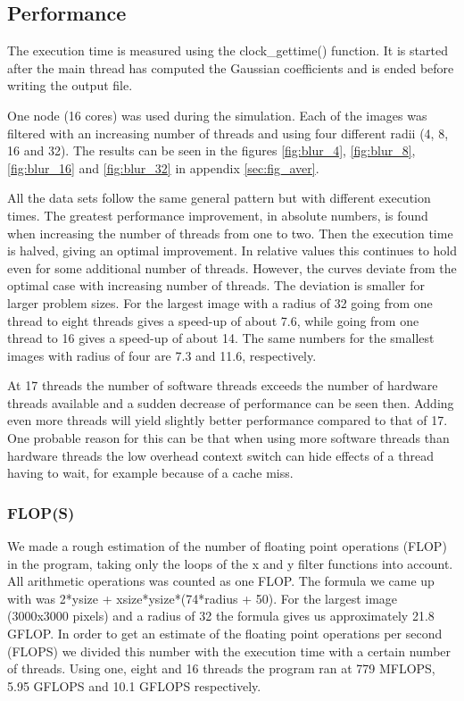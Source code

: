 \documentclass[a4paper, 12pt]{article}
\begin{document}
\subsection{Performance}
The execution time is measured using the clock\_gettime() function. It is
started after the main thread has computed the Gaussian coefficients 
and is ended before writing the output file. 

One node (16 cores) was used during the simulation. Each of the images was
filtered with an increasing number of threads and using four different radii
(4, 8, 16 and 32). The results can be seen in the figures
\ref{fig:blur_4}, \ref{fig:blur_8}, \ref{fig:blur_16} and \ref{fig:blur_32} in
appendix \ref{sec:fig_aver}.

All the data sets follow the same general pattern but with different execution
times. The greatest performance improvement, in absolute numbers,
is found when increasing the number of threads from one to two. Then the execution 
time is halved, giving an optimal improvement. In relative values this continues
to hold even for some additional number of threads. However, the curves deviate
from the optimal case with increasing number of threads. The deviation is
smaller for larger problem sizes. For the largest image with a radius of 32 
going from one thread to eight threads gives a speed-up of about 7.6, while
going from one thread to 16 gives a speed-up of about 14. The same numbers for
the smallest images with radius of four are 7.3 and 11.6, respectively. 

At 17 threads the number of software threads exceeds the number of hardware
threads available and a sudden decrease of performance can be seen then. Adding
even more threads will yield slightly better performance compared to that of 17.
One probable reason for this can be that when using more software threads than
hardware threads the low overhead context switch can hide effects of a thread
having to wait, for example because of a cache miss.

\subsubsection{FLOP(S)}
\label{sec:bflop}
We made a rough estimation of the number of floating point operations (FLOP) in the
program, taking only the loops of the x and y filter functions into account.
All arithmetic operations was counted as one FLOP. The formula we came up with
was 2*ysize + xsize*ysize*(74*radius + 50). For the largest image (3000x3000
pixels) and a radius of 32 the formula gives us approximately 21.8 GFLOP. In
order to get an estimate of the floating point operations per second (FLOPS) we
divided this number with the execution time with a certain number of threads.
Using one, eight and 16 threads the program ran at 779 MFLOPS, 5.95 GFLOPS and
10.1 GFLOPS respectively.
\end{document}
